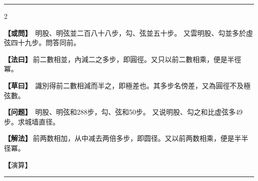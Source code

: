 \documentclass[11pt,a4paper]{article}
\newcommand{\longline}{\noindent\rule{\textwidth}{0.4pt}}
\newcommand{\clOWEN}[1]{%
  \par\vspace{0.3em}%
  \noindent\textcolor{problemcolor}{\textbf{【或問】}}\,{\tradfont #1}\par\nopagebreak%
}
\newcommand{\mdOWEN}[1]{%
  \par\vspace{0.3em}%
  \noindent\textcolor{problemcolor}{\textbf{【问题】}}\,{\modfont #1}\par\nopagebreak%
}
\newcommand{\clFAYUE}[1]{%
  \par\noindent\textcolor{methodcolor}{\textbf{【法曰】}}\,{\tradfont #1}\par\nopagebreak%
}
\newcommand{\mdFAYUE}[1]{%
  \par\noindent\textcolor{methodcolor}{\textbf{【解法】}}\,{\modfont #1}\par\nopagebreak%
}
\newcommand{\clTSAOYUE}[1]{%
  \par\noindent\textcolor{workcolor}{\textbf{【草曰】}}\,{\tradfont #1}\par%
}
\newcommand{\mdTSAOYUE}[1]{%
  \par\noindent\textcolor{workcolor}{\textbf【演算】}}\,{\modfont #1}\par%
\begin{document}
\vspace{0.3cm}
\begin{center}\longline\end{center}

\begin{paracol}{2}

\begin{leftcolumn}
\clOWEN{%
明股、明弦並二百八十八步，勾、弦並五十步。
又雲明股、勾並多於虛弦四十九步。問答同前。}

\clFAYUE{前二數相並，內減二之多步，即圓徑。又只以前二數相乘，便是半徑冪。}

\clTSAOYUE{%
識別得前二數相減而半之，即極差也。其多步名傍差，又為圓徑不及極弦數。}
\end{leftcolumn}

\switchcolumn

\begin{rightcolumn}
\mdOWEN{%
明股、明弦和288步，勾、弦和50步。
又说明股、勾之和比虚弦多49步。求城墙直径。}

\mdFAYUE{前两数相加，从中减去两倍多步，即圆径。又以前两数相乘，便是半半径冪。}

\mdTSAOYUE{%
辨识得：前两数相减折半，即极差。其多步名为「傍差」，又为圆径不及极弦之数。}
\end{rightcolumn}

\end{paracol}

\vspace{0.3cm}
\begin{center}\longline\end{center}
\end{document}
